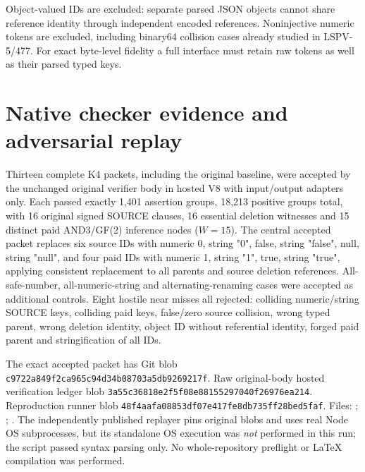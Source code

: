 \documentclass[11pt]{article}
\begin{document}
Object-valued IDs are excluded: separate parsed JSON objects cannot share reference identity through independent encoded references. Noninjective numeric tokens are excluded, including binary64 collision cases already studied in LSPV-5/477. For exact byte-level fidelity a full interface must retain raw tokens as well as their parsed typed keys.

\section*{Native checker evidence and adversarial replay}
Thirteen complete K4 packets, including the original baseline, were accepted by the unchanged original verifier body in hosted V8 with input/output adapters only. Each passed exactly 1,401 assertion groups, 18,213 positive groups total, with 16 original signed SOURCE clauses, 16 essential deletion witnesses and 15 distinct paid AND3/GF(2) inference nodes ($W=15$). The central accepted packet replaces six source IDs with numeric 0, string "0", false, string "false", null, string "null", and four paid IDs with numeric 1, string "1", true, string "true", applying consistent replacement to all parents and source deletion references. All-safe-number, all-numeric-string and alternating-renaming cases were accepted as additional controls. Eight hostile near misses all rejected: colliding numeric/string SOURCE keys, colliding paid keys, false/zero source collision, wrong typed parent, wrong deletion identity, object ID without referential identity, forged paid parent and stringification of all IDs.

The exact accepted packet has Git blob \texttt{c9722a849f2ca965c94d34b08703a5db9269217f}. Raw original-body hosted verification ledger blob \texttt{3a55c36818e2f5f08e88155297040f26976ea214}. Reproduction runner blob \texttt{48f4aafa08853df07e417fe8db735ff28bed5faf}. Files:
;
;
.
The independently published replayer pins original blobs and uses real Node OS subprocesses, but its standalone OS execution was \emph{not} performed in this run; the script passed syntax parsing only. No whole-repository preflight or LaTeX compilation was performed.
\end{document}
